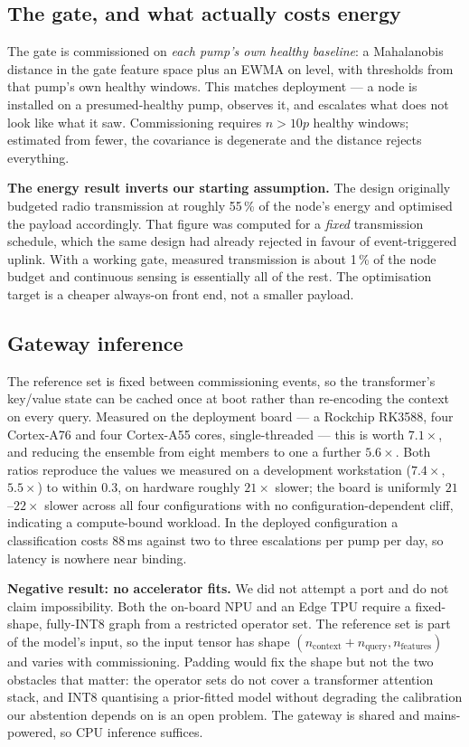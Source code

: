 \documentclass[conference,a4paper,10pt]{IEEEtran}
\begin{document}
\subsection{The gate, and what actually costs energy}
The gate is commissioned on \emph{each pump's own healthy baseline}: a Mahalanobis
distance in the gate feature space plus an EWMA on level, with thresholds from
that pump's own healthy windows. This matches deployment --- a node is installed
on a presumed-healthy pump, observes it, and escalates what does not look like
what it saw. Commissioning requires $n > 10p$ healthy windows; estimated from
fewer, the covariance is degenerate and the distance rejects everything.

\textbf{The energy result inverts our starting assumption.} The design originally
budgeted radio transmission at roughly 55\,\% of the node's energy and optimised
the payload accordingly. That figure was computed for a \emph{fixed} transmission
schedule, which the same design had already rejected in favour of event-triggered
uplink. With a working gate, measured transmission is about 1\,\% of the node
budget and continuous sensing is essentially all of the rest. The optimisation
target is a cheaper always-on front end, not a smaller payload.

\subsection{Gateway inference}
The reference set is fixed between commissioning events, so the transformer's
key/value state can be cached once at boot rather than re-encoding the context on
every query. Measured on the deployment board --- a Rockchip RK3588, four
Cortex-A76 and four Cortex-A55 cores, single-threaded --- this is worth
$7.1\times$, and reducing the ensemble from eight members to one a further
$5.6\times$. Both ratios reproduce the values we measured on a development
workstation ($7.4\times$, $5.5\times$) to within 0.3, on hardware roughly
$21\times$ slower; the board is uniformly $21$--$22\times$ slower across all four
configurations with no configuration-dependent cliff, indicating a compute-bound
workload. In the deployed configuration a classification costs 88\,ms against two
to three escalations per pump per day, so latency is nowhere near binding.

\textbf{Negative result: no accelerator fits.} We did not attempt a port and do
not claim impossibility. Both the on-board NPU and an Edge TPU require a
fixed-shape, fully-INT8 graph from a restricted operator set. The reference set is
part of the model's input, so the input tensor has shape
$(n_\text{context}+n_\text{query}, n_\text{features})$ and varies with
commissioning. Padding would fix the shape but not the two obstacles that matter:
the operator sets do not cover a transformer attention stack, and INT8 quantising
a prior-fitted model without degrading the calibration our abstention depends on
is an open problem. The gateway is shared and mains-powered, so CPU inference
suffices.
\end{document}
